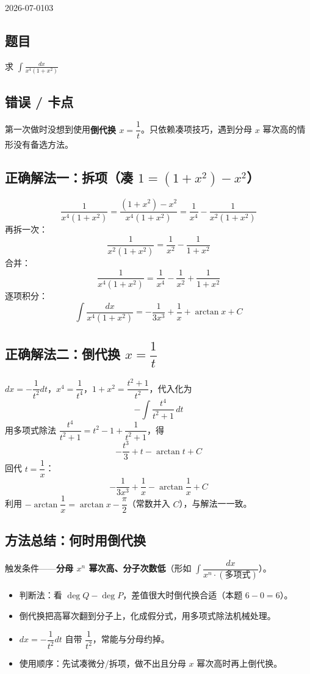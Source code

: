 \begin{mistake}{2026-07-01}{03}
\subsection*{题目}
求 $\displaystyle\int \frac{dx}{x^4(1+x^2)}$

\subsection*{错误 / 卡点}
第一次做时没想到使用\textbf{倒代换 $x=\dfrac{1}{t}$}。只依赖凑项技巧，遇到分母 $x$ 幂次高的情形没有备选方法。

\subsection*{正确解法一：拆项（凑 $1=(1+x^2)-x^2$）}
\[
\frac{1}{x^4(1+x^2)}=\frac{(1+x^2)-x^2}{x^4(1+x^2)}=\frac{1}{x^4}-\frac{1}{x^2(1+x^2)}
\]
再拆一次：
\[
\frac{1}{x^2(1+x^2)}=\frac{1}{x^2}-\frac{1}{1+x^2}
\]
合并：
\[
\frac{1}{x^4(1+x^2)}=\frac{1}{x^4}-\frac{1}{x^2}+\frac{1}{1+x^2}
\]
逐项积分：
\[
\int \frac{dx}{x^4(1+x^2)}=-\frac{1}{3x^3}+\frac{1}{x}+\arctan x+C
\]

\subsection*{正确解法二：倒代换 $x=\dfrac{1}{t}$}
$dx=-\dfrac{1}{t^2}dt$，$x^4=\dfrac{1}{t^4}$，$1+x^2=\dfrac{t^2+1}{t^2}$，代入化为
\[
-\int \frac{t^4}{t^2+1}\,dt
\]
用多项式除法 $\dfrac{t^4}{t^2+1}=t^2-1+\dfrac{1}{t^2+1}$，得
\[
-\frac{t^3}{3}+t-\arctan t+C
\]
回代 $t=\dfrac{1}{x}$：
\[
-\frac{1}{3x^3}+\frac{1}{x}-\arctan\frac{1}{x}+C
\]
利用 $-\arctan\dfrac1x=\arctan x-\dfrac{\pi}{2}$（常数并入 $C$），与解法一一致。

\subsection*{方法总结：何时用倒代换}
触发条件——\textbf{分母 $x^n$ 幂次高、分子次数低}（形如 $\int \dfrac{dx}{x^n\cdot(\text{多项式})}$）。
\begin{itemize}
\item 判断法：看 $\deg Q-\deg P$，差值很大时倒代换合适（本题 $6-0=6$）。
\item 倒代换把高幂次翻到分子上，化成假分式，用多项式除法机械处理。
\item $dx=-\dfrac{1}{t^2}dt$ 自带 $\dfrac{1}{t^2}$，常能与分母约掉。
\item 使用顺序：先试凑微分/拆项，做不出且分母 $x$ 幂次高时再上倒代换。
\end{itemize}
\end{mistake}
